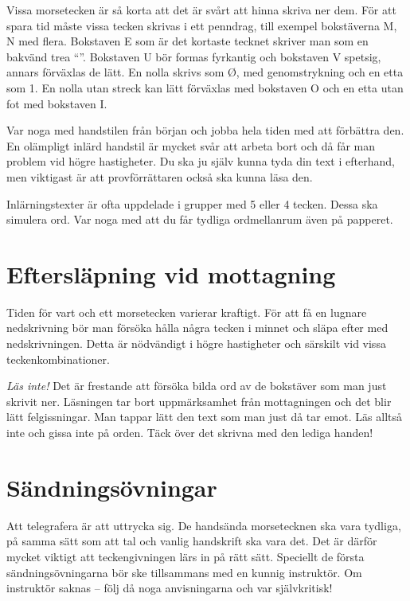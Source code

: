 Vissa morsetecken är så korta att det är svårt att hinna skriva ner dem.
För att spara tid måste vissa tecken skrivas i ett penndrag, till exempel
bokstäverna M, N med flera.
Bokstaven E som är det kortaste tecknet skriver man som en bakvänd trea
``''.
Bokstaven U bör formas fyrkantig och bokstaven V spetsig, annars förväxlas de
lätt.
En nolla skrivs som Ø, med genomstrykning och en etta som 1.
En nolla utan streck kan lätt förväxlas med bokstaven O och en etta utan fot med
bokstaven I.

Var noga med handstilen från början och jobba hela tiden med att förbättra den.
En olämpligt inlärd handstil är mycket svår att arbeta bort och då får man
problem vid högre hastigheter.
Du ska ju själv kunna tyda din text i efterhand, men viktigast är att
provförrättaren också ska kunna läsa den.

Inlärningstexter är ofta uppdelade i grupper med 5 eller 4 tecken.
Dessa ska simulera ord.
Var noga med att du får tydliga ordmellanrum även på papperet.

\section[Eftersläpning]{Eftersläpning vid mottagning}

Tiden för vart och ett morsetecken varierar kraftigt.
För att få en lugnare nedskrivning bör man försöka hålla några tecken i minnet
och släpa efter med nedskrivningen.
Detta är nödvändigt i högre hastigheter och särskilt vid vissa
teckenkombinationer.

\emph{Läs inte!}
Det är frestande att försöka bilda ord av de bokstäver som man just skrivit ner.
Läsningen tar bort uppmärksamhet från mottagningen och det blir lätt
felgissningar.
Man tappar lätt den text som man just då tar emot.
Läs alltså inte och gissa inte på orden.
Täck över det skrivna med den lediga handen!

\section{Sändningsövningar}

Att telegrafera är att uttrycka sig.
De handsända morsetecknen ska vara tydliga, på samma sätt som att tal och
vanlig handskrift ska vara det.
Det är därför mycket viktigt att teckengivningen lärs in på rätt sätt.
Speciellt de första sändningsövningarna bör ske tillsammans med en kunnig
instruktör.
Om instruktör saknas -- följ då noga anvisningarna och var självkritisk!

